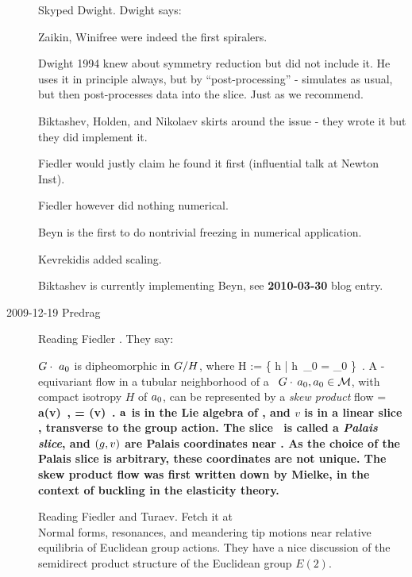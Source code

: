 \begin{description}
Skyped Dwight.
Dwight says:

Zaikin, Winifree were indeed the first spiralers.

Dwight 1994 knew about symmetry reduction but did not
include it. He uses it in principle always, but by ``post-processing''
- simulates as usual, but then post-processes data into the slice.
Just as we recommend.

Biktashev, Holden, and Nikolaev
skirts around the issue - they wrote it
 but they did implement it.

{Fiedler} would justly claim he found it first (influential talk
at Newton Inst).

Fiedler \etal{} however did nothing numerical.

Beyn is the first to do nontrivial freezing in numerical
application.

Kevrekidis added scaling.

Biktashev is currently implementing Beyn, see {\bf 2010-03-30}
blog entry.

\item[2009-12-19 Predrag]
Reading Fiedler \etal{}. They say:

$G \cdot \ a_0$ is dipheomorphic in $G/H$,
where
\beq
H := \{ h \in \Group | h \,\ssp_0 = \ssp_0 \}
\,.
A \Group-equivariant flow in a tubular neighborhood of a
\reqv\ $G \cdot \,a_0, a_0 \in {\cal M}$,
with compact isotropy $H$ of $a_0$, can be represented
by a {\em skew product} flow
\beq
\dot{\LieEl} = \LieEl \, \bf{a}(v)
	\,,\qquad
{} = \phi(v)
\,.
$\bf{a}$ is in the Lie algebra of \Group, and $v$ is in a linear
slice \pSRed, transverse to the group action. The slice  \pSRed\
is called a {\em Palais slice}, and $(g,v)$ are Palais
coordinates near \reqv. As the choice of the Palais slice is
arbitrary, these coordinates are not unique. The skew product flow
\refeq{FiedlSkPr}  was first
written down by Mielke, in the context of buckling
in the elasticity theory.

Reading Fiedler and Turaev.
Fetch it at
\\
{Normal forms, resonances, and meandering tip motions}
     near relative equilibria of {Euclidean} group actions.
They have a nice discussion of the semidirect product structure of the
Euclidean group $E(2)$.



\end{description}
